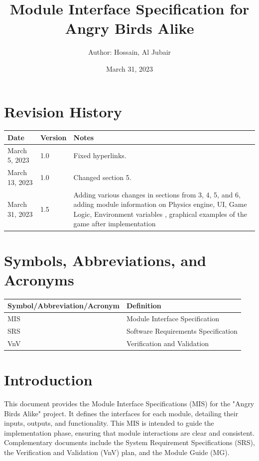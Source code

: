 \documentclass[12pt]{article}
\title{Module Interface Specification for Angry Birds Alike}
\author{Author: Hossain, Al Jubair}
\date{March 31, 2023}
\begin{document}
\maketitle

\newpage

\section*{Revision History}
\begin{longtable}{|p{2cm}|p{2cm}|p{10cm}|}
    \hline
    \textbf{Date} & \textbf{Version} & \textbf{Notes} \\
    \hline
    March 5, 2023 & 1.0 & Fixed hyperlinks.\\
    March 13, 2023 & 1.0 & Changed section 5.\\
    \hline
    March 31, 2023 & 1.5 & Adding various changes in sections from 3, 4, 5, and 6, adding module information on Physics engine, UI, Game Logic, Environment variables , graphical examples of the game after implementation \\
    \hline
\end{longtable}

\newpage

\tableofcontents

\newpage

\section{Symbols, Abbreviations, and Acronyms}
\begin{longtable}{|l|l|}
    \hline
    \textbf{Symbol/Abbreviation/Acronym} & \textbf{Definition} \\
    \hline
    MIS & Module Interface Specification \\
    SRS & Software Requirements Specification \\
    VnV & Verification and Validation \\
    \hline
\end{longtable}
\section{Introduction}
This document provides the Module Interface Specifications (MIS) for the "Angry Birds Alike" project. It defines the interfaces for each module, detailing their inputs, outputs, and functionality. This MIS is intended to guide the implementation phase, ensuring that module interactions are clear and consistent. Complementary documents include the System Requirement Specifications (SRS), the Verification and Validation (VnV) plan, and the Module Guide (MG).
\end{document}

